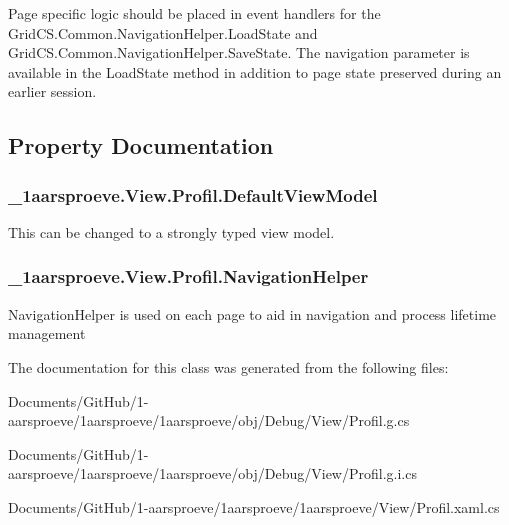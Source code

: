 Page specific logic should be placed in event handlers for the Grid\+C\+S.\+Common.\+Navigation\+Helper.\+Load\+State and Grid\+C\+S.\+Common.\+Navigation\+Helper.\+Save\+State. The navigation parameter is available in the Load\+State method in addition to page state preserved during an earlier session. 

\subsection{Property Documentation}
\hypertarget{class__1aarsproeve_1_1_view_1_1_profil_ad66fb294e243d2475bc5d16da6ddfeb0}{}
\subsubsection[{Default\+View\+Model}]{ \+\_\+1aarsproeve.\+View.\+Profil.\+Default\+View\+Model\hspace{0.3cm}{\ttfamily [get]}}\label{class__1aarsproeve_1_1_view_1_1_profil_ad66fb294e243d2475bc5d16da6ddfeb0}


This can be changed to a strongly typed view model. 

\hypertarget{class__1aarsproeve_1_1_view_1_1_profil_a16410b60470d2871c88c39af75b07130}{}
\subsubsection[{Navigation\+Helper}]{ \+\_\+1aarsproeve.\+View.\+Profil.\+Navigation\+Helper\hspace{0.3cm}{\ttfamily [get]}}\label{class__1aarsproeve_1_1_view_1_1_profil_a16410b60470d2871c88c39af75b07130}


Navigation\+Helper is used on each page to aid in navigation and process lifetime management 



The documentation for this class was generated from the following files\+:\begin{DoxyCompactItemize}
\item 
Documents/\+Git\+Hub/1-\/aarsproeve/1aarsproeve/1aarsproeve/obj/\+Debug/\+View/Profil.\+g.\+cs\item 
Documents/\+Git\+Hub/1-\/aarsproeve/1aarsproeve/1aarsproeve/obj/\+Debug/\+View/Profil.\+g.\+i.\+cs\item 
Documents/\+Git\+Hub/1-\/aarsproeve/1aarsproeve/1aarsproeve/\+View/Profil.\+xaml.\+cs\end{DoxyCompactItemize}
